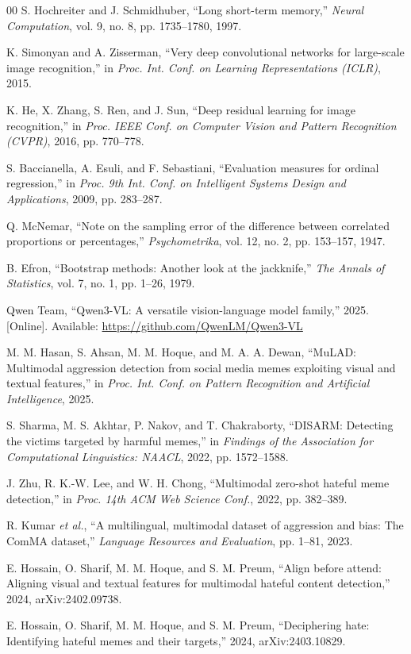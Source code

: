 \documentclass[conference]{IEEEtran}
\begin{document}
\begin{thebibliography}{00}
 S. Hochreiter and J. Schmidhuber, ``Long short-term memory,'' \textit{Neural Computation}, vol. 9, no. 8, pp. 1735--1780, 1997.

 K. Simonyan and A. Zisserman, ``Very deep convolutional networks for large-scale image recognition,'' in \textit{Proc. Int. Conf. on Learning Representations (ICLR)}, 2015.

 K. He, X. Zhang, S. Ren, and J. Sun, ``Deep residual learning for image recognition,'' in \textit{Proc. IEEE Conf. on Computer Vision and Pattern Recognition (CVPR)}, 2016, pp. 770--778.

 S. Baccianella, A. Esuli, and F. Sebastiani, ``Evaluation measures for ordinal regression,'' in \textit{Proc. 9th Int. Conf. on Intelligent Systems Design and Applications}, 2009, pp. 283--287.

 Q. McNemar, ``Note on the sampling error of the difference between correlated proportions or percentages,'' \textit{Psychometrika}, vol. 12, no. 2, pp. 153--157, 1947.

 B. Efron, ``Bootstrap methods: Another look at the jackknife,'' \textit{The Annals of Statistics}, vol. 7, no. 1, pp. 1--26, 1979.

 Qwen Team, ``Qwen3-VL: A versatile vision-language model family,'' 2025. [Online]. Available: \url{https://github.com/QwenLM/Qwen3-VL}

 M. M. Hasan, S. Ahsan, M. M. Hoque, and M. A. A. Dewan, ``MuLAD: Multimodal aggression detection from social media memes exploiting visual and textual features,'' in \textit{Proc. Int. Conf. on Pattern Recognition and Artificial Intelligence}, 2025.

 S. Sharma, M. S. Akhtar, P. Nakov, and T. Chakraborty, ``DISARM: Detecting the victims targeted by harmful memes,'' in \textit{Findings of the Association for Computational Linguistics: NAACL}, 2022, pp. 1572--1588.

 J. Zhu, R. K.-W. Lee, and W. H. Chong, ``Multimodal zero-shot hateful meme detection,'' in \textit{Proc. 14th ACM Web Science Conf.}, 2022, pp. 382--389.

 R. Kumar \textit{et al.}, ``A multilingual, multimodal dataset of aggression and bias: The ComMA dataset,'' \textit{Language Resources and Evaluation}, pp. 1--81, 2023.

 E. Hossain, O. Sharif, M. M. Hoque, and S. M. Preum, ``Align before attend: Aligning visual and textual features for multimodal hateful content detection,'' 2024, arXiv:2402.09738.

 E. Hossain, O. Sharif, M. M. Hoque, and S. M. Preum, ``Deciphering hate: Identifying hateful memes and their targets,'' 2024, arXiv:2403.10829.

\end{thebibliography}
\end{document}
